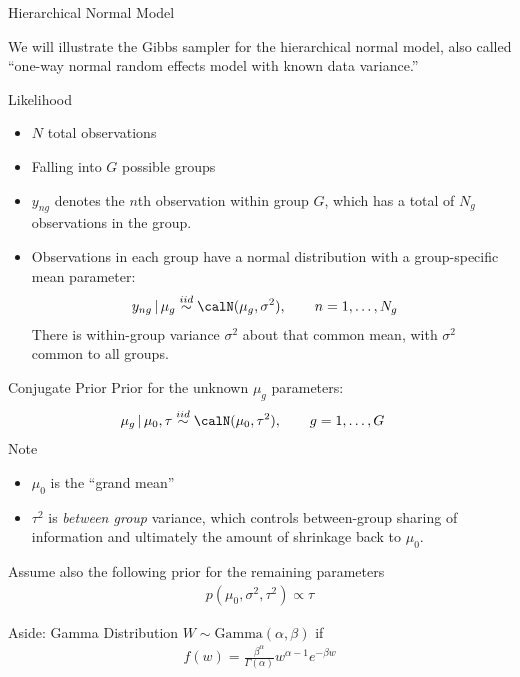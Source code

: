 \documentclass[aspectratio=169, handout]{beamer}
\newcommand{\iid}{\overset{iid}{\sim}}
\begin{document}
{\footnotesize
\begin{frame}{Hierarchical Normal Model}

We will illustrate the Gibbs sampler for the
\alert{hierarchical normal model},
also called ``one-way normal random effects model with known data
variance.''

Likelihood
\begin{itemize}
  \item $N$ total observations
  \item Falling into $G$ possible \alert{groups}

  \item $y_{ng}$ denotes the $n$th observation within group $G$, which
    has a total of $N_g$ observations in the group.


  \item
    Observations in each group have a normal distribution with a
    group-specific mean parameter:
    \begin{align*}
      y_{ng} \,|\, \mu_g &\iid \calN(\mu_g, \sigma^2), \qquad n = 1, \ldots, N_g
    \end{align*}
    There is \alert{within-group} variance $\sigma^2$ about that common
    mean, with $\sigma^2$ common to all groups.

\end{itemize}
\end{frame}
}



{\footnotesize
\begin{frame}{Conjugate Prior}
Prior for the unknown $\mu_g$ parameters:
\begin{align*}
   \mu_g\,|\,\mu_0,\tau &\iid \calN(\mu_0, \tau^2), \qquad g = 1, \ldots, G
\end{align*}
Note
\begin{itemize}
  \item $\mu_0$ is the ``grand mean''
  \item $\tau^2$ is \emph{between group} variance, which controls
    between-group sharing of information and ultimately the amount of
    shrinkage back to $\mu_0$.
\end{itemize}
Assume also the following prior for the remaining parameters
\begin{align*}
  p(\mu_0,\sigma^2,\tau^2)
  \propto \tau
\end{align*}
\end{frame}
}

{\footnotesize
\begin{frame}{Aside: Gamma Distribution}
$W\sim \text{Gamma}(\alpha,\beta)$ if
\begin{align*}
  f(w)
  =
  \frac{\beta^\alpha}{\Gamma(\alpha)}
  w^{\alpha-1}
  e^{-\beta w}
\end{align*}
\end{frame}
}
\end{document}
